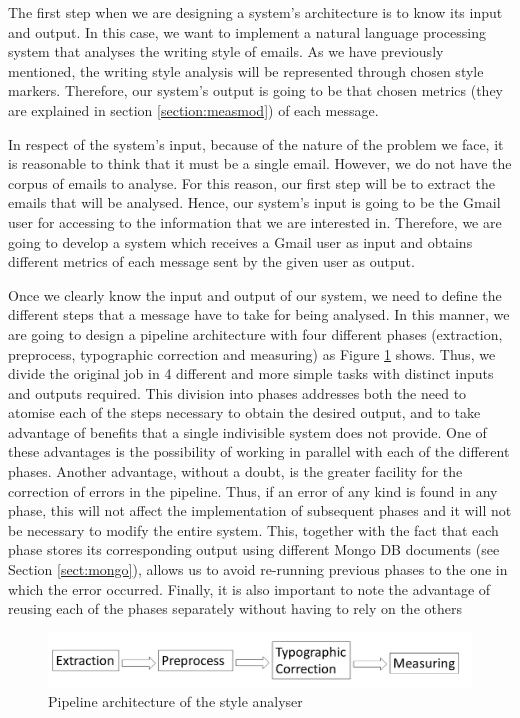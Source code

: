 The first step when we are designing a system's architecture is to know its input and output. In this case, we want to implement a natural language processing system that analyses the writing style of emails. As we have previously mentioned, the writing style analysis will be represented through chosen style markers. Therefore, our system's output is going to be that chosen metrics (they are explained in section \ref{section:measmod}) of each message.

In respect of the system's input, because of the nature of the problem we face, it is reasonable to think that it must be a single email. However, we do not have the corpus of emails to analyse. For this reason, our first step will be to extract the emails that will be analysed. Hence, our system's input is going to be the Gmail user for accessing to the information that we are interested in. Therefore, we are going to develop a system which receives a Gmail user as input and obtains different metrics of each message sent by the given user as output.

Once we clearly know the input and output of our system, we need to define the different steps that a message have to take for being analysed. In this manner, we are going to design a pipeline architecture with four different phases (extraction, preprocess, typographic correction and measuring) as Figure \ref{fig:arch} shows. Thus, we divide the original job in 4 different and more simple tasks with distinct inputs and outputs required. This division into phases addresses both the need to atomise each of the steps necessary to obtain the desired output, and to take advantage of benefits that a single indivisible system does not provide. One of these advantages is the possibility of working in parallel with each of the different phases. Another advantage, without a doubt, is the greater facility for the correction of errors in the pipeline. Thus, if an error of any kind is found in any phase, this will not affect the implementation of subsequent phases and it will not be necessary to modify the entire system. This, together with the fact that each phase stores its corresponding output using different Mongo DB documents (see Section \ref{sect:mongo}), allows us to avoid re-running previous phases to the one in which the error occurred. Finally, it is also important to note the advantage of reusing each of the phases separately without having to rely on the others

\begin{figure}[h]
	\centering%
	\includegraphics[width = 1\textwidth]{Imagenes/Bitmap/architecture.png}%
	\caption{Pipeline architecture of the style analyser}%
	\label{fig:arch}
\end{figure}

